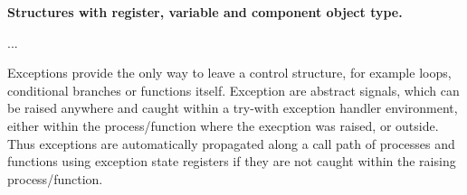 \documentclass[a4paper,12pt,twoside,english]{article}
\begin{document}
\def\exdescription{\caption{\bf Structures with register, variable and component object type.
}\label{example:6}}
\exampleBplain
\begin{example}[H]\let\normalsize\footnotesize \normalsize
\exdescription
\end{example}
\excontent



\def\thesubsubsection{\tocXXVI}
\secIII{\label{toclabelXXVI}\thesubsubsection}
...


\vskip5pt



\def\thesubsubsection{\tocXXVII}
\secIII{\label{toclabelXXVII}\thesubsubsection}
Exceptions provide the only way to leave a control structure, for example loops, conditional
branches or functions itself. Exception are abstract signals, which can be raised anywhere and caught within a try-with exception handler environment, either
within the process/function where the execption was raised, or outside. Thus exceptions are automatically propagated along a call path of processes and
functions using exception state registers if they are not caught within the raising process/function.


\vskip5pt
\end{document}
